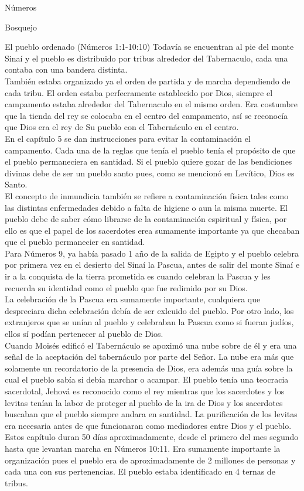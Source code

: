 \begin{section}{Números}
\begin{itemize}
	\end{itemize}
	\begin{subsection}{Bosquejo}
		\begin{subsubsection}{El pueblo ordenado (Números 1:1-10:10)}
			Todavía se encuentran al pie del monte Sinaí y el pueblo es distribuido por tribus alrededor del Tabernaculo, cada una contaba con una bandera distinta.\\
		También estaba organizado ya el orden de partida y de marcha dependiendo de cada tribu. El orden estaba perfecramente establecido por Dios, siempre el campamento estaba alrededor del Tabernaculo en el mismo orden. Era costumbre que la tienda del rey se colocaba en el centro del campamento, así se reconocía que Dios era el rey de Su pueblo con el Tabernáculo en el centro.\\
		En el capítulo 5 se dan instrucciones para evitar la contaminación el campamento. Cada una de la reglas que tenía el pueblo tenía el propósito de que el pueblo permaneciera en santidad. Si el pueblo quiere gozar de las bendiciones divinas debe de ser un pueblo santo pues, como se mencionó en Levítico, Dios es Santo.\\
		El concepto de inmundicia también se refiere a contaminación física tales como las distintas enfermedades debido a falta de higiene o aun la misma muerte. El pueblo debe de saber cómo librarse de la contaminación espiritual y física, por ello es que el papel de los sacerdotes erea sumamente importante ya que checaban que el pueblo permanecier en santidad.\\
		Para Números 9, ya había pasado 1 año de la salida de Egipto y el pueblo celebra por primera vez en el desierto del Sinaí la Pascua, antes de salir del monte Sinaí e ir a la conquista de la tierra prometida es cuando celebran la Pascua y les recuerda su identidad como el pueblo que fue redimido por su Dios.\\
		La celebración de la Pascua era sumamente importante, cualquiera que despreciara dicha celebración debía de ser exlcuido del pueblo. Por otro lado, los extranjeros que se unían al pueblo y celebraban la Pascua como si fueran judíos, ellos sí podían pertenecer al pueblo de Dios.\\
		Cuando Moisés edificó el Tabernáculo se apoximó una nube sobre de él y era una señal de la aceptación del tabernáculo por parte del Señor. La nube era más que solamente un recordatorio de la presencia de Dios, era además una guía sobre la cual el pueblo sabía si debía marchar o acampar. El pueblo tenía una teocracia sacerdotal, Jehová es reconocido como el rey mientras que los sacerdotes y los levitas tenían la labor de proteger al pueblo de la ira de Dios y los sacerdotes buscaban que el pueblo siempre andara en santidad. La purificación de los levitas era necesaria antes de que funcionaran como mediadores entre Dios y el pueblo. Estos capítulo duran 50 días aproximadamente, desde el primero del mes segundo hasta que levantan marcha en Números 10:11. Era sumamente importante la organización pues el pueblo era de aproximadamente de 2 millones de personas y cada una con sus pertenencias. El pueblo estaba identificado en 4 ternas de tribus. 


\end{subsubsection}
\end{subsection}
\end{section}

